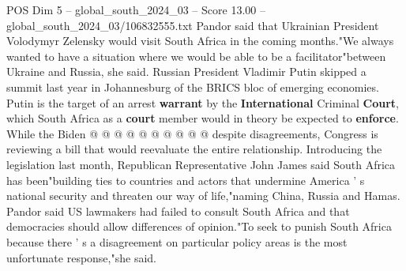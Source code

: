 \begin{textsample}{POS Dim 5 – global\_south\_2024\_03 – Score 13.00 – global\_south\_2024\_03/106832555.txt}
Pandor said that Ukrainian President Volodymyr Zelensky would visit South Africa in the coming months."We always wanted to have a situation where we would be able to be a facilitator"between Ukraine and Russia, she said.
Russian President Vladimir Putin skipped a summit last year in Johannesburg of the BRICS bloc of emerging economies.
Putin is the target of an arrest \textbf{warrant} by the \textbf{International} Criminal \textbf{Court}, which South Africa as a \textbf{court} member would in theory be expected to \textbf{enforce}.
While the Biden @ @ @ @ @ @ @ @ @ @ despite disagreements, Congress is reviewing a bill that would reevaluate the entire relationship.
Introducing the legislation last month, Republican Representative John James said South Africa has been"building ties to countries and actors that undermine America ' s national security and threaten our way of life,"naming China, Russia and Hamas.
Pandor said US lawmakers had failed to consult South Africa and that democracies should allow differences of opinion."To seek to punish South Africa because there ' s a disagreement on particular policy areas is the most unfortunate response,"she said.

\end{textsample}
